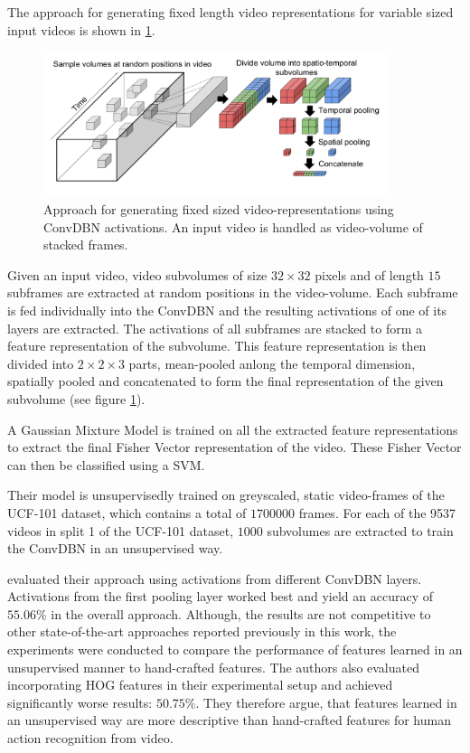 The approach for generating fixed length video representations for variable sized input videos is shown in \ref{fig:palasekpatras_approachschematik}.

\begin{figure}[H]
    \centering
    \includegraphics[width=0.9\textwidth]{img_deep/palasekpatras_approachschematik}
    \caption{Approach for generating fixed sized video-representations using ConvDBN activations. An input video is handled as video-volume of stacked frames. \cite{lee_convolutional_2009-1}}
    \label{fig:palasekpatras_approachschematik}
\end{figure}

Given an input video, video subvolumes of size $32 \times 32$ pixels and of length $15$ subframes are extracted at random positions in the video-volume.
Each subframe is fed individually into the ConvDBN and the resulting activations of one of its layers are extracted.
The activations of all subframes are stacked to form a feature representation of the subvolume.
This feature representation is then divided into $2 \times 2 \times 3$ parts, mean-pooled anlong the temporal dimension, spatially pooled and concatenated to form the final representation of the given subvolume (see figure \ref{fig:palasekpatras_approachschematik}). \cite{lee_convolutional_2009-1}

A Gaussian Mixture Model is trained on all the extracted feature representations to extract the final Fisher Vector representation of the video.
These Fisher Vector can then be classified using a SVM.
 
Their model is unsupervisedly trained on greyscaled, static video-frames of the UCF-101 dataset, which contains a total of $1700000$ frames.
For each of the 9537 videos in split 1 of the UCF-101 dataset, $1000$ subvolumes are extracted to train the ConvDBN in an unsupervised way.

\textcite{palasek_action_2016} evaluated their approach using activations from different ConvDBN layers.
Activations from the first pooling layer worked best and yield an accuracy of $55.06\%$ in the overall approach.
Although, the results are not competitive to other state-of-the-art approaches reported previously in this work, the experiments were conducted to compare the performance of features learned in an unsupervised manner to hand-crafted features.
The authors also evaluated incorporating HOG features in their experimental setup and achieved significantly worse results: $50.75\%$.
They therefore argue, that features learned in an unsupervised way are more descriptive than hand-crafted features for human action recognition from video.
\cite{lee_convolutional_2009-1}


